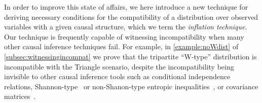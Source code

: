 \documentclass[aps,english,superscriptaddress,onecolumn,twoside,longbibliography,pra,floatfix,fleqn,nofootinbib]{revtex4-1}%
\theoremstyle{definition}
\begin{document}


In order to improve this state of affairs, we here introduce a new technique for deriving necessary conditions for the compatibility of a distribution over observed variables with a given causal structure, which we term the {\em inflation technique}. Our technique is frequently capable of witnessing incompatibility when many other causal inference techniques fail. For example, in \cref{example:noWdist} of \cref{subsec:witnessingincompat} we prove that the tripartite ``W-type'' distribution is incompatible with the Triangle scenario, despite the incompatibility being invisible to other causal inference tools such as conditional independence relations, Shannon-type~\cite{fritz2013marginal,chaves2014novel,chaves2014informationinference} or non-Shanon-type entropic inequalities~\cite{weilenmann2016entropic}, or covariance matrices~\cite{kela2016covariance}.
\end{document}
